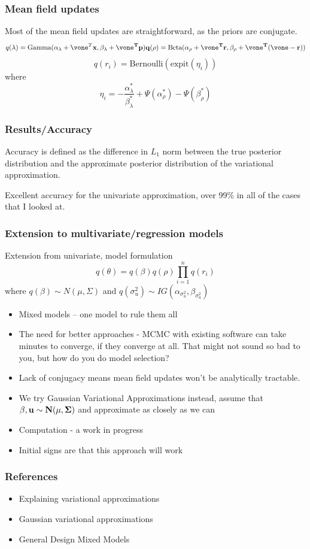 \documentclass{beamer}
\begin{document}
\begin{frame}
\frametitle{Mean field updates}
Most of the mean field updates are straightforward, as the priors are conjugate.
$$
q(\lambda) = \text{Gamma}(\alpha_\lambda + \vone^T \vx, \beta_\lambda + \vone^T\vp)
q(\rho) = \text{Beta}(\alpha_\rho + \vone^T\vr, \beta_\rho + \vone^T(\vone - \vr))
$$
$$
q(r_i) = \text{Bernoulli}(\text{expit}(\eta_i))
$$
where
$$
\eta_i = - \frac{\alpha_\lambda^*}{\beta_\lambda^*} + \Psi(\alpha_\rho^*) - \Psi(\beta_\rho^*)
$$
\end{frame}

\begin{frame}
\frametitle{Results/Accuracy}
Accuracy is defined as the difference in $L_1$ norm between the true posterior distribution and
the approximate posterior distribution of the variational approximation.

Excellent accuracy for the univariate approximation, over 99\% in all of the cases that I looked at.
\end{frame}

\begin{frame}
\frametitle{Extension to multivariate/regression models}
Extension from univariate, model formulation
$$
q(\theta) = q(\beta) q(\rho) \prod_{i=1}^n q(r_i)
$$
where
$q(\beta) \sim N(\mu, \Sigma)$ and
$q(\sigma_u^2) \sim IG(\alpha_{\sigma_u^2}, \beta_{\sigma_u^2})$

\begin{itemize}
\item Mixed models -- one model to rule them all
\item The need for better approaches - MCMC with existing software can take minutes to
converge, if they converge at all. That might not sound so bad to you, but how do you
do model selection?
\end{itemize}
\end{frame}

\begin{frame}
\begin{itemize}
\item Lack of conjugacy means mean field updates won't be analytically tractable.
\item We try Gaussian Variational Approximations instead, assume that $\beta, \bf u \sim N(\bf \mu, \Sigma)$
and approximate as closely as we can
\item Computation - a work in progress
\item Initial signs are that this approach will work
\end{itemize}
\end{frame}

\begin{frame}
\frametitle{References}
\begin{itemize}
\item Explaining variational approximations
\item Gaussian variational approximations
\item General Design Mixed Models
\end{itemize}
\end{frame}
\end{document}
